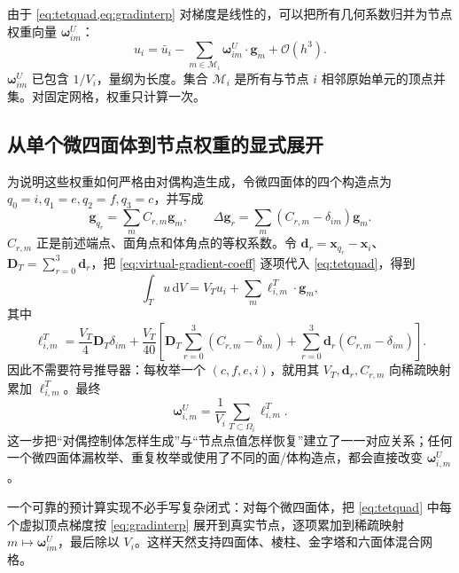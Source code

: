 \documentclass[UTF8,a4paper,11pt,openany]{ctexrep}
\numberwithin{equation}{chapter}
\newcommand{\dd}{\,\mathrm d}
\newcommand{\Order}{\mathcal O}
\begin{document}
由于 \cref{eq:tetquad,eq:gradinterp} 对梯度是线性的，可以把所有几何系数归并为节点权重向量 $\bm\omega^{U}_{im}$：
\begin{equation}
  u_i=\bar u_i-\sum_{m\in\mathcal M_i}
  \bm\omega^{U}_{im}\cdot\bm g_m+\Order(h^3).
  \label{eq:pointrecover}
\end{equation}
$\bm\omega^{U}_{im}$ 已包含 $1/V_i$，量纲为长度。集合 $\mathcal M_i$ 是所有与节点 $i$ 相邻原始单元的顶点并集。对固定网格，权重只计算一次。

\subsection{从单个微四面体到节点权重的显式展开}

为说明这些权重如何严格由对偶构造生成，令微四面体的四个构造点为
$q_0=i,q_1=e,q_2=f,q_3=c$，并写成
\begin{equation}
  \bm g_{q_r}=\sum_mC_{r,m}\bm g_m,
  \qquad
  \Delta\bm g_r
  =\sum_m(C_{r,m}-\delta_{im})\bm g_m.
  \label{eq:virtual-gradient-coeff}
\end{equation}
$C_{r,m}$ 正是前述端点、面角点和体角点的等权系数。令
$\bm d_r=\bm x_{q_r}-\bm x_i$、$\bm D_T=\sum_{r=0}^3\bm d_r$，把
\cref{eq:virtual-gradient-coeff} 逐项代入 \cref{eq:tetquad}，得到
\begin{equation}
  \int_Tu\dd V
  =V_Tu_i+\sum_m\bm\ell^T_{i,m}\cdot\bm g_m,
  \label{eq:tet-node-weight-form}
\end{equation}
其中
\begin{equation}
  \boxed{
  \bm\ell^T_{i,m}
  =\frac{V_T}{4}\bm D_T\delta_{im}
  +\frac{V_T}{40}\left[
    \bm D_T\sum_{r=0}^{3}(C_{r,m}-\delta_{im})
    +\sum_{r=0}^{3}\bm d_r(C_{r,m}-\delta_{im})
  \right].}
  \label{eq:tet-explicit-node-weight}
\end{equation}
因此不需要符号推导器：每枚举一个 $(c,f,e,i)$，就用其
$V_T,\bm d_r,C_{r,m}$ 向稀疏映射累加 $\bm\ell^T_{i,m}$。最终
\begin{equation}
  \boxed{
  \bm\omega^U_{i,m}
  =\frac1{V_i}\sum_{T\subset\Omega_i}\bm\ell^T_{i,m}.}
  \label{eq:point-weight-from-dual}
\end{equation}
这一步把“对偶控制体怎样生成”与“节点点值怎样恢复”建立了一一对应关系；任何一个微四面体漏枚举、重复枚举或使用了不同的面/体构造点，都会直接改变 $\bm\omega^U_{i,m}$。

一个可靠的预计算实现不必手写复杂闭式：对每个微四面体，把 \cref{eq:tetquad} 中每个虚拟顶点梯度按 \cref{eq:gradinterp} 展开到真实节点，逐项累加到稀疏映射 $m\mapsto\bm\omega_{im}^{U}$，最后除以 $V_i$。这样天然支持四面体、棱柱、金字塔和六面体混合网格。
\end{document}
